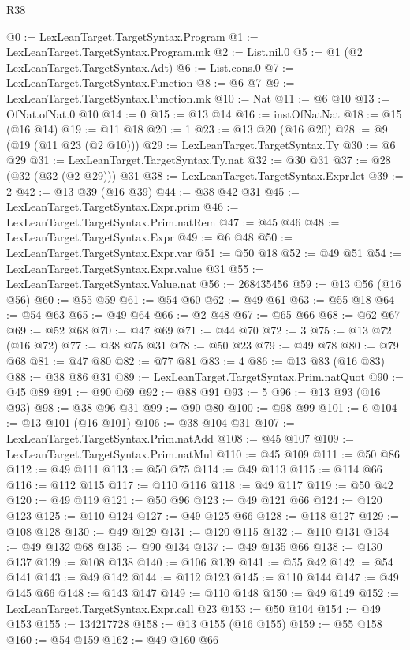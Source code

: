\begin{lexlean}{R38}
\begin{coremodule}
@0 := LexLeanTarget.TargetSyntax.Program
@1 := LexLeanTarget.TargetSyntax.Program.mk
@2 := List.nil.{0}
@5 := @1 (@2 LexLeanTarget.TargetSyntax.Adt)
@6 := List.cons.{0}
@7 := LexLeanTarget.TargetSyntax.Function
@8 := @6 @7
@9 := LexLeanTarget.TargetSyntax.Function.mk
@10 := Nat
@11 := @6 @10
@13 := OfNat.ofNat.{0} @10
@14 := 0
@15 := @13 @14
@16 := instOfNatNat
@18 := @15 (@16 @14)
@19 := @11 @18
@20 := 1
@23 := @13 @20 (@16 @20)
@28 := @9 (@19 (@11 @23 (@2 @10)))
@29 := LexLeanTarget.TargetSyntax.Ty
@30 := @6 @29
@31 := LexLeanTarget.TargetSyntax.Ty.nat
@32 := @30 @31
@37 := @28 (@32 (@32 (@2 @29))) @31
@38 := LexLeanTarget.TargetSyntax.Expr.let
@39 := 2
@42 := @13 @39 (@16 @39)
@44 := @38 @42 @31
@45 := LexLeanTarget.TargetSyntax.Expr.prim
@46 := LexLeanTarget.TargetSyntax.Prim.natRem
@47 := @45 @46
@48 := LexLeanTarget.TargetSyntax.Expr
@49 := @6 @48
@50 := LexLeanTarget.TargetSyntax.Expr.var
@51 := @50 @18
@52 := @49 @51
@54 := LexLeanTarget.TargetSyntax.Expr.value @31
@55 := LexLeanTarget.TargetSyntax.Value.nat
@56 := 268435456
@59 := @13 @56 (@16 @56)
@60 := @55 @59
@61 := @54 @60
@62 := @49 @61
@63 := @55 @18
@64 := @54 @63
@65 := @49 @64
@66 := @2 @48
@67 := @65 @66
@68 := @62 @67
@69 := @52 @68
@70 := @47 @69
@71 := @44 @70
@72 := 3
@75 := @13 @72 (@16 @72)
@77 := @38 @75 @31
@78 := @50 @23
@79 := @49 @78
@80 := @79 @68
@81 := @47 @80
@82 := @77 @81
@83 := 4
@86 := @13 @83 (@16 @83)
@88 := @38 @86 @31
@89 := LexLeanTarget.TargetSyntax.Prim.natQuot
@90 := @45 @89
@91 := @90 @69
@92 := @88 @91
@93 := 5
@96 := @13 @93 (@16 @93)
@98 := @38 @96 @31
@99 := @90 @80
@100 := @98 @99
@101 := 6
@104 := @13 @101 (@16 @101)
@106 := @38 @104 @31
@107 := LexLeanTarget.TargetSyntax.Prim.natAdd
@108 := @45 @107
@109 := LexLeanTarget.TargetSyntax.Prim.natMul
@110 := @45 @109
@111 := @50 @86
@112 := @49 @111
@113 := @50 @75
@114 := @49 @113
@115 := @114 @66
@116 := @112 @115
@117 := @110 @116
@118 := @49 @117
@119 := @50 @42
@120 := @49 @119
@121 := @50 @96
@123 := @49 @121 @66
@124 := @120 @123
@125 := @110 @124
@127 := @49 @125 @66
@128 := @118 @127
@129 := @108 @128
@130 := @49 @129
@131 := @120 @115
@132 := @110 @131
@134 := @49 @132 @68
@135 := @90 @134
@137 := @49 @135 @66
@138 := @130 @137
@139 := @108 @138
@140 := @106 @139
@141 := @55 @42
@142 := @54 @141
@143 := @49 @142
@144 := @112 @123
@145 := @110 @144
@147 := @49 @145 @66
@148 := @143 @147
@149 := @110 @148
@150 := @49 @149
@152 := LexLeanTarget.TargetSyntax.Expr.call @23
@153 := @50 @104
@154 := @49 @153
@155 := 134217728
@158 := @13 @155 (@16 @155)
@159 := @55 @158
@160 := @54 @159
@162 := @49 @160 @66

\end{coremodule}
\end{lexlean}
